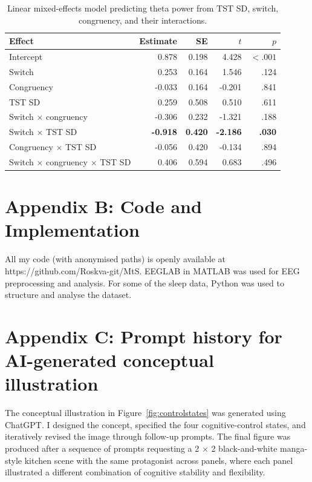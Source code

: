 \documentclass[12pt,a4paper]{report}
\begin{document}
\begin{appendices}
\begin{table}[H]
\centering
\small
\caption{Linear mixed-effects model predicting theta power from TST SD, switch, congruency, and their interactions.}
\label{tab:app_theta_tstsd}
\begin{tabularx}{\textwidth}{Xrrrr}
\toprule
Effect & Estimate & SE & $t$ & $p$ \\
\midrule
Intercept & 0.878 & 0.198 & 4.428 & $< .001$ \\
Switch & 0.253 & 0.164 & 1.546 & .124 \\
Congruency & -0.033 & 0.164 & -0.201 & .841 \\
TST SD & 0.259 & 0.508 & 0.510 & .611 \\
Switch $\times$ congruency & -0.306 & 0.232 & -1.321 & .188 \\
Switch $\times$ TST SD & \textbf{-0.918} & \textbf{0.420} & \textbf{-2.186} & \textbf{.030} \\
Congruency $\times$ TST SD & -0.056 & 0.420 & -0.134 & .894 \\
Switch $\times$ congruency $\times$ TST SD & 0.406 & 0.594 & 0.683 & .496 \\
\bottomrule
\end{tabularx}
\end{table}

\chapter{Appendix B: Code and Implementation}
\label{app:code}

All my code (with anonymised paths) is openly available at https://github.com/Roskva-git/MtS. EEGLAB in MATLAB was used for EEG preprocessing and analysis. For some of the sleep data, Python was used to structure and analyse the dataset.


\chapter{Appendix C: Prompt history for AI-generated conceptual illustration}
\label{app:controlstates}

The conceptual illustration in Figure~\ref{fig:controlstates} was generated using ChatGPT. I designed the concept, specified the four cognitive-control states, and iteratively revised the image through follow-up prompts. The final figure was produced after a sequence of prompts requesting a 2 \(\times\) 2 black-and-white manga-style kitchen scene with the same protagonist across panels, where each panel illustrated a different combination of cognitive stability and flexibility.


\end{appendices}
\end{document}
